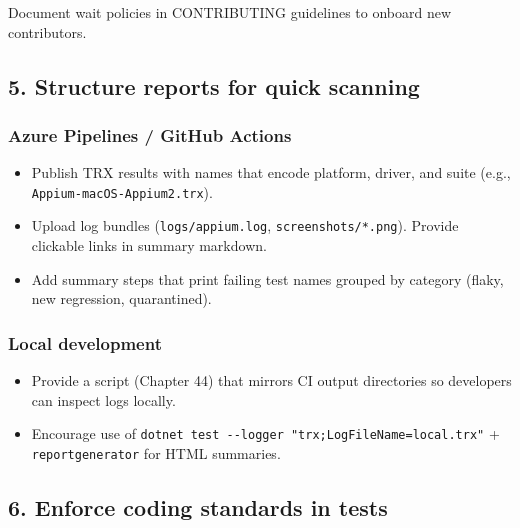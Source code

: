 Document wait policies in CONTRIBUTING guidelines to onboard new
contributors.

\subsection{5. Structure reports for quick
scanning}\label{structure-reports-for-quick-scanning}

\subsubsection{Azure Pipelines / GitHub
Actions}\label{azure-pipelines-github-actions}

\begin{itemize}
\tightlist
\item
  Publish TRX results with names that encode platform, driver, and suite
  (e.g., \passthrough{\lstinline!Appium-macOS-Appium2.trx!}).
\item
  Upload log bundles (\passthrough{\lstinline!logs/appium.log!},
  \passthrough{\lstinline!screenshots/*.png!}). Provide clickable links
  in summary markdown.
\item
  Add summary steps that print failing test names grouped by category
  (flaky, new regression, quarantined).
\end{itemize}

\subsubsection{Local development}\label{local-development}

\begin{itemize}
\tightlist
\item
  Provide a script (Chapter 44) that mirrors CI output directories so
  developers can inspect logs locally.
\item
  Encourage use of
  \passthrough{\lstinline!dotnet test --logger "trx;LogFileName=local.trx"!}
  + \passthrough{\lstinline!reportgenerator!} for HTML summaries.
\end{itemize}

\subsection{6. Enforce coding standards in
tests}\label{enforce-coding-standards-in-tests}

